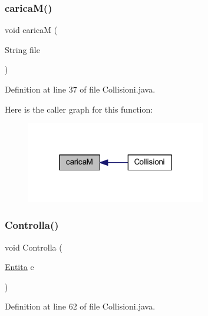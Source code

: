 \subsubsection{\texorpdfstring{carica\+M()}{caricaM()}}
{\footnotesize\ttfamily void caricaM (\begin{DoxyParamCaption}\item[{String}]{file }\end{DoxyParamCaption})}



Definition at line 37 of file Collisioni.\+java.

Here is the caller graph for this function\+:
\nopagebreak
\begin{figure}[H]
\begin{center}
\leavevmode
\includegraphics[width=223pt]{classa_1_1survival_1_1game_1_1_collisioni_a373d83d9b42d31e72ccc982a3fd85ea9_icgraph}
\end{center}
\end{figure}
\mbox{\label{classa_1_1survival_1_1game_1_1_collisioni_a839c38fa5d30f0458af3dcf4bf04f358}} 
\subsubsection{\texorpdfstring{Controlla()}{Controlla()}}
{\footnotesize\ttfamily void Controlla (\begin{DoxyParamCaption}\item[{\hyperlink{class_entita_1_1_entita}{Entita}}]{e }\end{DoxyParamCaption})}



Definition at line 62 of file Collisioni.\+java.


